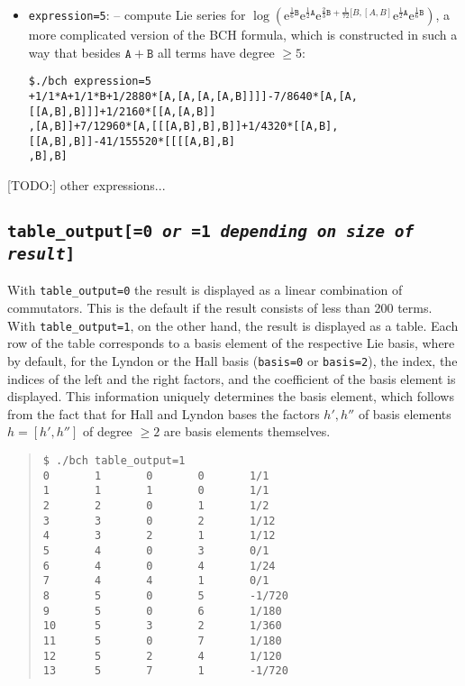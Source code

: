 \documentclass[11pt,a4paper]{article}
\newcommand{\ee}{\mathrm{e}}
\renewcommand{\AA}{\mathtt{A}}
\newcommand{\BB}{\mathtt{B}}
\begin{document}
\begin{itemize}[leftmargin=*]
\item {\tt expression=5}: -- compute Lie series for $\log(\ee^{\frac{1}{6}\BB}\ee^{\frac{1}{2}\AA}
\ee^{\frac{2}{3}\BB+\frac{1}{72}[B,[A,B]}\ee^{\frac{1}{2}\AA}\ee^{\frac{1}{6}\BB})$,
a more complicated version of the BCH formula, which is constructed in such a way that 
besides $\AA+\BB$ all terms have degree $\geq 5$:

{\small\begin{BVerbatim}
$./bch expression=5
+1/1*A+1/1*B+1/2880*[A,[A,[A,[A,B]]]]-7/8640*[A,[A,[[A,B],B]]]+1/2160*[[A,[A,B]]
,[A,B]]+7/12960*[A,[[[A,B],B],B]]+1/4320*[[A,B],[[A,B],B]]-41/155520*[[[[A,B],B]
,B],B]
\end{BVerbatim}
}
\end{itemize}
[TODO:] other expressions...

\subsection*{\tt table\_output[=0 {\em or} =1 {\em depending on size of result}]}
With \verb|table_output=0| the result is displayed as a linear combination of commutators. 
This is the default if the result consists of less than 200 terms.
With
\verb|table_output=1|, on the other hand, the result is displayed as a table.
Each row of the table corresponds to a basis element of the respective Lie basis,
where by default, for the Lyndon or the Hall
basis (\verb|basis=0| or \verb|basis=2|),
the index, the indices of the left and
the right factors, and the coefficient of the basis element is displayed. 
This information uniquely determines the basis element, which follows from the
fact that 
for Hall and Lyndon bases the factors $h', h''$ of basis elements $h=[h',h'']$ of degree $\geq 2$ are
basis elements themselves.
\begin{quote} %
{\small\begin{BVerbatim}
$ ./bch table_output=1
0       1       0       0       1/1
1       1       1       0       1/1
2       2       0       1       1/2
3       3       0       2       1/12
4       3       2       1       1/12
5       4       0       3       0/1
6       4       0       4       1/24
7       4       4       1       0/1
8       5       0       5       -1/720
9       5       0       6       1/180
10      5       3       2       1/360
11      5       0       7       1/180
12      5       2       4       1/120
13      5       7       1       -1/720
\end{BVerbatim}
}\end{quote}
\end{document}
